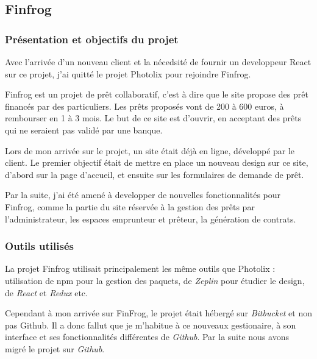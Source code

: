\documentclass[12pt,a4paper]{article}
\begin{document}
  \subsection{Finfrog}\label{finfrog}

  \subsubsection{Présentation et objectifs du
  projet}\label{pruxe9sentation-et-objectifs-du-projet-1}

  \bigskip

  Avec l'arrivée d'un nouveau client et la nécedsité de fournir un
  developpeur React sur ce projet, j'ai quitté le projet Photolix pour
  rejoindre Finfrog.

  \bigskip

  Finfrog est un projet de prêt collaboratif, c'est à dire que le site
  propose des prêt financés par des particuliers. Les prêts proposés vont
  de 200 à 600 euros, à rembourser en 1 à 3 mois. Le but de ce site est
  d'ouvrir, en acceptant des prêts qui ne seraient pas validé par une
  banque.

  \bigskip

  Lors de mon arrivée sur le projet, un site était déjà en ligne,
  développé par le client. Le premier objectif était de mettre en place un
  nouveau design sur ce site, d'abord sur la page d'accueil, et ensuite
  sur les formulaires de demande de prêt.

  \bigskip

  Par la suite, j'ai été amené à developper de nouvelles fonctionnalités
  pour Finfrog, comme la partie du site réservée à la gestion des prêts
  par l'administrateur, les espaces emprunteur et prêteur, la génération
  de contrats.

  \subsubsection{Outils utilisés}\label{outils-utilisuxe9s-1}

  \bigskip

  La projet Finfrog utilisait principalement les même outils que Photolix
  : utilisation de npm pour la gestion des paquets, de \emph{Zeplin} pour
  étudier le design, de \emph{React} et \emph{Redux} etc.

  \bigskip

  Cependant à mon arrivée sur FinFrog, le projet était hébergé sur
  \emph{Bitbucket} et non pas Github. Il a donc fallut que je m'habitue à
  ce nouveaux gestionaire, à son interface et ses fonctionnalités
  différentes de \emph{Github}. Par la suite nous avons migré le projet
  sur \emph{Github}.
\end{document}
